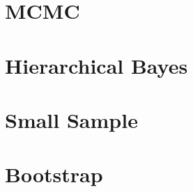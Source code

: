\documentclass[c, dvipsnames]{beamer}  %
\begin{document}
%
%
% 
% 
%
%
%
%
%
% 
\section{MCMC}
 
 
\section{Hierarchical Bayes}




\section{Small Sample}

%
%
%
%
%


\section{Bootstrap}
\end{document}
